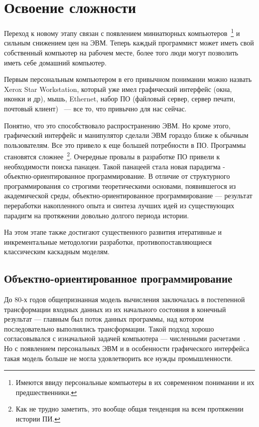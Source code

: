 \section{Освоение сложности}

Переход к новому этапу связан с появлением миниатюрных компьютеров~\footnote{Имеются ввиду персональные компьютеры в их современном понимании и их предшественники.} и сильным снижением цен на ЭВМ. Теперь каждый программист может иметь свой собственный компьютер на рабочем месте, более того люди могут позволить иметь себе домашний компьютер.

Первым персональным компьютером в его привычном понимании можно назвать Xerox Star Workstation, который уже имел графический интерфейс (окна, иконки и др), мышь, Ethernet, набор ПО (файловый сервер, сервер печати, почтовый клиент)~\cite{PCHIST} — все то, что привычно для нас сейчас.

Понятно, что это способствовало распространению ЭВМ. Но кроме этого, графический интерфейс и манипулятор сделали ЭВМ гораздо ближе к обычным пользователям. Все это привело к еще большей потребности в ПО. Программы становятся сложнее~\footnote{Как не трудно заметить, это вообще общая тенденция на всем протяжении истории ПИ.}. Очередные провалы в разработке ПО привели к необходимости поиска панацеи. Такой панацеей стала новая парадигма - объектно-ориентированное программирование. В отличие от структурного программирования со строгими теоретическими основами, появившегося из академической среды, объектно-ориентированное программирование — результат переработки накопленного опыта и синтеза лучших идей из существующих парадигм на протяжении довольно долгого периода истории.

На этом этапе также достигают существенного развития итеративные и инкрементальные методологии разработки, противопоставляющиеся классическим каскадным моделям.

\subsection{Объектно-ориентированное программирование}

До 80-х годов общепризнанная модель вычисления заключалась в постепенной трансформации входных данных из их начального состояния в конечный результат — главным был поток данных программы, над котором последовательно выполнялись трансформации. Такой подход хорошо согласовывался с изначальной задачей компьютера — численными расчетами~\cite{Wirth:2008:HIST}. Но с появлением персональных ЭВМ и в особенности графического интерфейса такая модель больше не могла удовлетворить все нужды промышленности.

